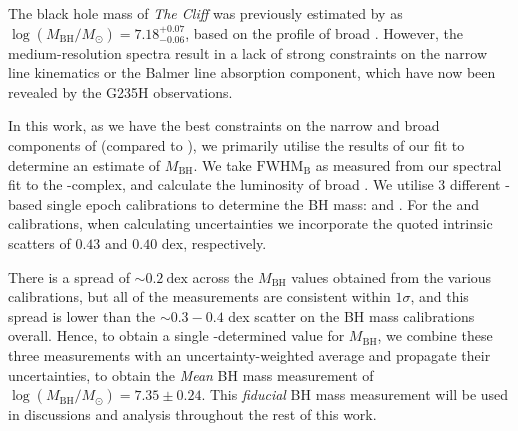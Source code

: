 \documentclass[fleqn,usenatbib]{mnras}
\newcommand{\Halpha}{\text{H\textalpha}\xspace}
\newcommand{\Hbeta}{\text{H\textbeta}\xspace}
\newcommand{\cliff}{\textit{The Cliff}\xspace}
\begin{document}
The black hole mass of \cliff was previously estimated by \cite{deGraaff2025} as $\log(M_\mathrm{BH}/M_\odot) = 7.18^{+0.07}_{-0.06}$, based on the profile of broad \Halpha. 
However, the medium-resolution spectra result in a lack of strong constraints on the narrow line kinematics or the Balmer line absorption component, which have now been revealed by the G235H observations. 

In this work, as we have the best constraints on the narrow and broad components of \Hbeta (compared to \Halpha), we primarily utilise the results of our \Hbeta fit to determine an estimate of $M_\mathrm{BH}$. We take $\mathrm{FWHM}_\mathrm{B}$ as measured from our spectral fit to the \Hbeta-\OIIIL complex, and calculate the luminosity of broad \Hbeta. 
We utilise 3 different \Hbeta-based single epoch calibrations to determine the BH mass: \cite{Greene2005, Vestergaard2006} and \cite{Parlanti2025}. 
For the \cite{Vestergaard2006} and \cite{Parlanti2025} calibrations, when calculating uncertainties we incorporate the quoted intrinsic scatters of $0.43$ and $0.40$ dex, respectively. 

There is a spread of $\sim 0.2 \ \mathrm{dex}$ across the $M_\mathrm{BH}$ values obtained from the various \Hbeta calibrations, but all of the measurements are consistent within $1\sigma$, and this spread is lower than the $\sim0.3-0.4$ dex scatter on the BH mass calibrations overall. 
Hence, to obtain a single \Hbeta-determined value for $M_\mathrm{BH}$, we combine these three measurements with an uncertainty-weighted average and propagate their uncertainties, to obtain the \textit{Mean} BH mass measurement of $\log(M_\mathrm{BH}/M_\odot) = 7.35\pm0.24$. 
This \textit{fiducial} BH mass measurement will be used in discussions and analysis throughout the rest of this work.
\end{document}
